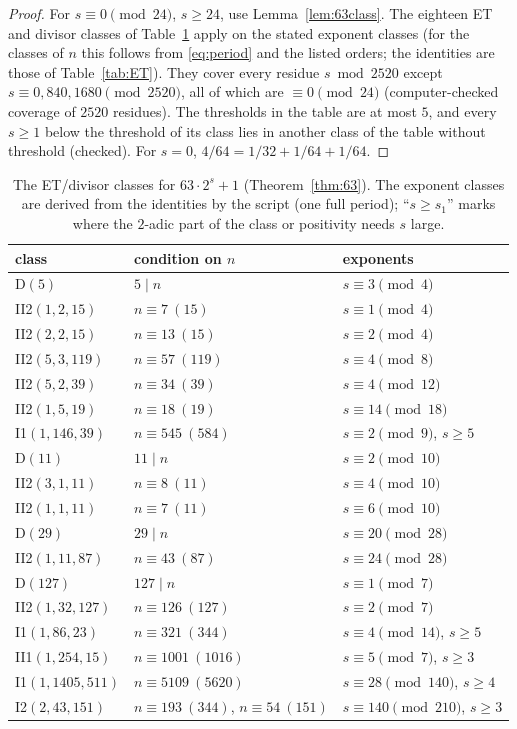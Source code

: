 \documentclass[11pt,reqno]{amsart}
\theoremstyle{definition}
\begin{document}
\begin{proof}
For $s\equiv0\pmod{24}$, $s\ge24$, use Lemma~\ref{lem:63class}.  The
eighteen ET and divisor classes of Table~\ref{tab:63} apply on the stated
exponent classes (for the classes of $n$ this follows from
\eqref{eq:period} and the listed orders; the identities are those of
Table~\ref{tab:ET}).  They cover every residue $s\bmod2520$ except
$s\equiv0,840,1680\pmod{2520}$, all of which are $\equiv0\pmod{24}$
(computer-checked coverage of $2520$ residues).  The thresholds in the table
are at most $5$, and every $s\ge1$ below the threshold of its class lies in
another class of the table without threshold (checked).  For $s=0$,
$4/64=1/32+1/64+1/64$.
\end{proof}
\begin{table}[ht]
\centering\small
\begin{tabular}{lll}
\toprule
class & condition on $n$ & exponents\\
\midrule
D$(5)$ & $5\mid n$ & $s\equiv 3\pmod{4}$ \\
II2$(1,2,15)$ & $n\equiv7\ (15)$ & $s\equiv 1\pmod{4}$ \\
II2$(2,2,15)$ & $n\equiv13\ (15)$ & $s\equiv 2\pmod{4}$ \\
II2$(5,3,119)$ & $n\equiv57\ (119)$ & $s\equiv 4\pmod{8}$ \\
II2$(5,2,39)$ & $n\equiv34\ (39)$ & $s\equiv 4\pmod{12}$ \\
II2$(1,5,19)$ & $n\equiv18\ (19)$ & $s\equiv 14\pmod{18}$ \\
I1$(1,146,39)$ & $n\equiv545\ (584)$ & $s\equiv 2\pmod{9}$, $s\ge5$ \\
D$(11)$ & $11\mid n$ & $s\equiv 2\pmod{10}$ \\
II2$(3,1,11)$ & $n\equiv8\ (11)$ & $s\equiv 4\pmod{10}$ \\
II2$(1,1,11)$ & $n\equiv7\ (11)$ & $s\equiv 6\pmod{10}$ \\
D$(29)$ & $29\mid n$ & $s\equiv 20\pmod{28}$ \\
II2$(1,11,87)$ & $n\equiv43\ (87)$ & $s\equiv 24\pmod{28}$ \\
D$(127)$ & $127\mid n$ & $s\equiv 1\pmod{7}$ \\
II2$(1,32,127)$ & $n\equiv126\ (127)$ & $s\equiv 2\pmod{7}$ \\
I1$(1,86,23)$ & $n\equiv321\ (344)$ & $s\equiv 4\pmod{14}$, $s\ge5$ \\
II1$(1,254,15)$ & $n\equiv1001\ (1016)$ & $s\equiv 5\pmod{7}$, $s\ge3$ \\
I1$(1,1405,511)$ & $n\equiv5109\ (5620)$ & $s\equiv 28\pmod{140}$, $s\ge4$ \\
I2$(2,43,151)$ & $n\equiv193\ (344)$, $n\equiv54\ (151)$ & $s\equiv 140\pmod{210}$, $s\ge3$ \\
\bottomrule
\end{tabular}
\caption{The ET/divisor classes for $63\cdot2^s+1$ (Theorem~\ref{thm:63}).  The
exponent classes are derived from the identities by the script (one full
period); ``$s\ge s_1$'' marks where the $2$-adic part of the class or
positivity needs $s$ large.}\label{tab:63}
\end{table}
\end{document}
